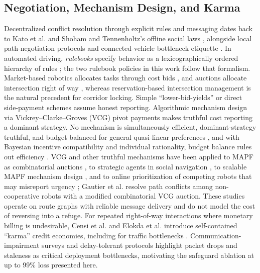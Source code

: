 \subsection{Negotiation, Mechanism Design, and Karma}
Decentralized conflict resolution through explicit rules and messaging dates back to Kato et al. \cite{kato1992coordinating} and Shoham and Tennenholtz's offline social laws \cite{shoham1995social}, alongside local path-negotiation protocols \cite{purwin2008theory} and connected-vehicle bottleneck etiquette \cite{bottleneckiv2023}. In automated driving, \emph{rulebooks} specify behavior as a lexicographically ordered hierarchy of rules \cite{censi2019rulebooks,collin2020safety}; the two rulebook policies in this work follow that formalism. Market-based robotics allocates tasks through cost bids \cite{gerkey2002sold}, and auctions allocate intersection right of way \cite{rey2021online}, whereas reservation-based intersection management \cite{dresner2008multiagent} is the natural precedent for corridor locking. Simple ``lower-bid-yields'' or direct side-payment schemes assume honest reporting. Algorithmic mechanism design \cite{nisan2001algorithmic} via Vickrey--Clarke--Groves (VCG) pivot payments \cite{vickrey1961counterspeculation,clarke1971multipart,groves1973incentives} makes truthful cost reporting a dominant strategy. No mechanism is simultaneously efficient, dominant-strategy truthful, and budget balanced for general quasi-linear preferences \cite{green1977characterization}, and with Bayesian incentive compatibility and individual rationality, budget balance rules out efficiency \cite{myerson1983efficient}. VCG and other truthful mechanisms have been applied to MAPF as combinatorial auctions \cite{amir2015mapfauction}, to strategic agents in social navigation \cite{chandra2023socialmapf}, to scalable MAPF mechanism design \cite{friedrich2024scalable}, and to online prioritization of competing robots that may misreport urgency \cite{das2021omcorp}; Gautier et al. \cite{gautier2022negotiated} resolve path conflicts among non-cooperative robots with a modified combinatorial VCG auction. These studies operate on route graphs with reliable message delivery and do not model the cost of reversing into a refuge. For repeated right-of-way interactions where monetary billing is undesirable, Censi et al. \cite{censi2019karma} and Elokda et al. \cite{elokda2024karma,elokda2025carma} introduce self-contained ``karma'' credit economies, including for traffic bottlenecks \cite{elokda2025carma}. Communication-impairment surveys and delay-tolerant protocols \cite{commfail2021,gielis2022critical} highlight packet drops and staleness as critical deployment bottlenecks, motivating the safeguard ablation at up to 99\% loss presented here.


